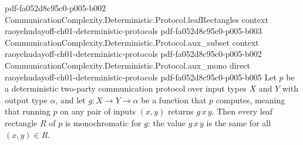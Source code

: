 \begin{lemma}
  {pdf-fa052d8c95c0-p005-b002}
\proofstep
  {CommunicationComplexity.Deterministic.Protocol.leafRectangles}
  {context}
  {raoyehudayoff-ch01-deterministic-protocols}
  {pdf-fa052d8c95c0-p005-b003}
\proofstep
  {CommunicationComplexity.Deterministic.Protocol.aux_subset}
  {context}
  {raoyehudayoff-ch01-deterministic-protocols}
  {pdf-fa052d8c95c0-p005-b002}
\proofstep
  {CommunicationComplexity.Deterministic.Protocol.aux_mono}
  {direct}
  {raoyehudayoff-ch01-deterministic-protocols}
  {pdf-fa052d8c95c0-p005-b005}
Let $p$ be a deterministic two-party communication protocol over input types $X$ and $Y$
with output type $\alpha$, and let $g : X \to Y \to \alpha$ be a function that $p$
computes, meaning that running $p$ on any pair of inputs $(x, y)$ returns $g\,x\,y$.
Then every leaf rectangle $R$ of $p$ is monochromatic for $g$: the value $g\,x\,y$ is
the same for all $(x, y) \in R$.
\end{lemma}

